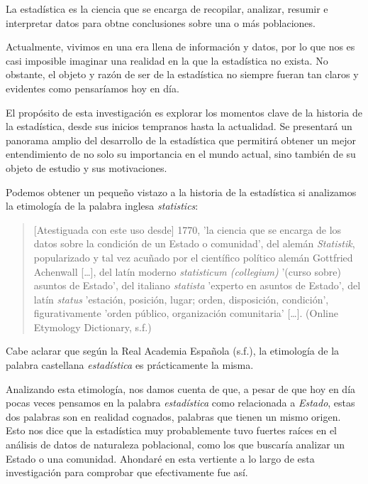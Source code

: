 \documentclass[12pt, a4paper]{article}
\begin{document}
\sffamily


La estadística es la ciencia que se encarga de recopilar, analizar, resumir e interpretar datos para obtne conclusiones sobre una o más poblaciones.

Actualmente, vivimos en una era llena de información y datos, por lo que nos es casi imposible imaginar una realidad en la que la estadística no exista. No obstante, el objeto y razón de ser de la estadística no siempre fueran tan claros y evidentes como pensaríamos hoy en día.

El propósito de esta investigación es explorar los momentos clave de la historia de la estadística, desde sus inicios tempranos hasta la actualidad. Se presentará un panorama amplio del desarrollo de la estadística que permitirá obtener un mejor entendimiento de no solo su importancia en el mundo actual, sino también de su objeto de estudio y sus motivaciones.

Podemos obtener un pequeño vistazo a la historia de la estadística si analizamos la etimología de la palabra inglesa \textit{statistics}:

\begin{quote}
	[Atestiguada con este uso desde] 1770, 'la ciencia que se encarga de los datos sobre la condición de un Estado o comunidad', del alemán \textit{Statistik}, popularizado y tal vez acuñado por el científico político alemán Gottfried Achenwall […], del latín moderno \textit{statisticum (collegium)} '(curso sobre) asuntos de Estado', del italiano \textit{statista} 'experto en asuntos de Estado', del latín \textit{status} 'estación, posición, lugar; orden, disposición, condición', figurativamente 'orden público, organización comunitaria' […]. (Online Etymology Dictionary, s.f.)
\end{quote}

Cabe aclarar que según la Real Academia Española (s.f.), la etimología de la palabra castellana \textit{estadística} es prácticamente la misma.

Analizando esta etimología, nos damos cuenta de que, a pesar de que hoy en día pocas veces pensamos en la palabra \textit{estadística} como relacionada a \textit{Estado}, estas dos palabras son en realidad cognados, palabras que tienen un mismo origen. Esto nos dice que la estadística muy probablemente tuvo fuertes raíces en el análisis de datos de naturaleza poblacional, como los que buscaría analizar un Estado o una comunidad. Ahondaré en esta vertiente a lo largo de esta investigación para comprobar que efectivamente fue así.
\end{document}
